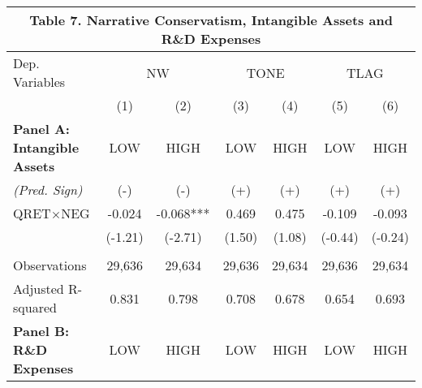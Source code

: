 \begin{table}[H]   \label{T7}
  \begin{center}
  	    \begin{tabular}{lcccccc}
  		\multicolumn{7}{c}{\textbf{Table 7. Narrative Conservatism, Intangible Assets and R\&D Expenses}} \\
  		\midrule
  		\midrule
  		Dep. Variables & \multicolumn{2}{c}{NW} & \multicolumn{2}{c}{TONE} & \multicolumn{2}{c}{TLAG} \\
  		& (1) & \multicolumn{1}{c}{(2)} & (3) & \multicolumn{1}{c}{(4)} & (5) & \multicolumn{1}{c}{(6)} \\
  		\midrule
  		\textbf{Panel A: Intangible Assets} & LOW & HIGH & LOW & HIGH & LOW & HIGH \\
  		\cmidrule{2-7}
  		\rowcolor[rgb]{ .933,  .925,  .882} \textit{(Pred. Sign)} & (-) & (-) & (+) & (+) & (+) & (+) \\
  		\rowcolor[rgb]{ .933,  .925,  .882} QRET$\times$NEG & -0.024 & -0.068*** & 0.469 & 0.475 & -0.109 & -0.093 \\
  		\rowcolor[rgb]{ .933,  .925,  .882} & (-1.21) & (-2.71) & (1.50) & (1.08) & (-0.44) & (-0.24) \\
  		&   &   &   &   &   &  \\
  		Observations & 29,636 & 29,634 & 29,636 & 29,634 & 29,636 & 29,634 \\
  		Adjusted R-squared & 0.831 & 0.798 & 0.708 & 0.678 & 0.654 & 0.693 \\
  		\midrule
  		\textbf{Panel B: R\&D Expenses} & LOW & HIGH & LOW & HIGH & LOW & HIGH \\
  		\cmidrule{2-7}
  

\end{tabular}
\end{center}
\end{table}
